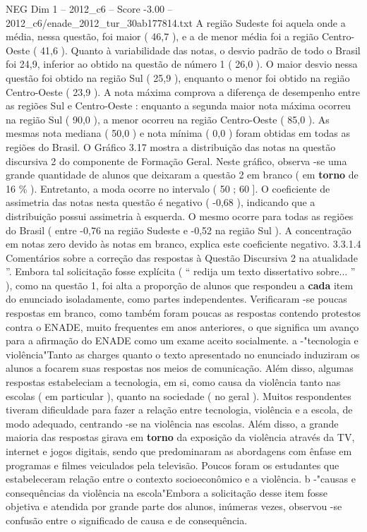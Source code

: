 \begin{textsample}{NEG Dim 1 – 2012\_c6 – Score -3.00 – 2012\_c6/enade\_2012\_tur\_30ab177814.txt}
A região Sudeste foi aquela onde a média, nessa questão, foi maior ( 46,7 ), e a de menor média foi a região Centro-Oeste ( 41,6 ).
Quanto à variabilidade das notas, o desvio padrão de todo o Brasil foi 24,9, inferior ao obtido na questão de número 1 ( 26,0 ).
O maior desvio nessa questão foi obtido na região Sul ( 25,9 ), enquanto o menor foi obtido na região Centro-Oeste ( 23,9 ).
A nota máxima comprova a diferença de desempenho entre as regiões Sul e Centro-Oeste : enquanto a segunda maior nota máxima ocorreu na região Sul ( 90,0 ), a menor ocorreu na região Centro-Oeste ( 85,0 ).
As mesmas nota mediana ( 50,0 ) e nota mínima ( 0,0 ) foram obtidas em todas as regiões do Brasil.
O Gráfico 3.17 mostra a distribuição das notas na questão discursiva 2 do componente de Formação Geral.
Neste gráfico, observa -se uma grande quantidade de alunos que deixaram a questão 2 em branco ( em \textbf{torno} de 16 \% ).
Entretanto, a moda ocorre no intervalo ( 50 ; 60 ].
O coeficiente de assimetria das notas nesta questão é negativo ( -0,68 ), indicando que a distribuição possui assimetria à esquerda.
O mesmo ocorre para todas as regiões do Brasil ( entre -0,76 na região Sudeste e -0,52 na região Sul ).
A concentração em notas zero devido às notas em branco, explica este coeficiente negativo. 3.3.1.4 Comentários sobre a correção das respostas à Questão Discursiva 2 na atualidade ”.
Embora tal solicitação fosse explícita ( “ redija um texto dissertativo sobre... ” ), como na questão 1, foi alta a proporção de alunos que respondeu a \textbf{cada} item do enunciado isoladamente, como partes independentes.
Verificaram -se poucas respostas em branco, como também foram poucas as respostas contendo protestos contra o ENADE, muito frequentes em anos anteriores, o que significa um avanço para a afirmação do ENADE como um exame aceito socialmente. a -"tecnologia e violência"Tanto as charges quanto o texto apresentado no enunciado induziram os alunos a focarem suas respostas nos meios de comunicação.
Além disso, algumas respostas estabeleciam a tecnologia, em si, como causa da violência tanto nas escolas ( em particular ), quanto na sociedade ( no geral ).
Muitos respondentes tiveram dificuldade para fazer a relação entre tecnologia, violência e a escola, de modo adequado, centrando -se na violência nas escolas.
Além disso, a grande maioria das respostas girava em \textbf{torno} da exposição da violência através da TV, internet e jogos digitais, sendo que predominaram as abordagens com ênfase em programas e filmes veiculados pela televisão.
Poucos foram os estudantes que estabeleceram relação entre o contexto socioeconômico e a violência. b -"causas e consequências da violência na escola"Embora a solicitação desse item fosse objetiva e atendida por grande parte dos alunos, inúmeras vezes, observou -se confusão entre o significado de causa e de consequência.

\end{textsample}
